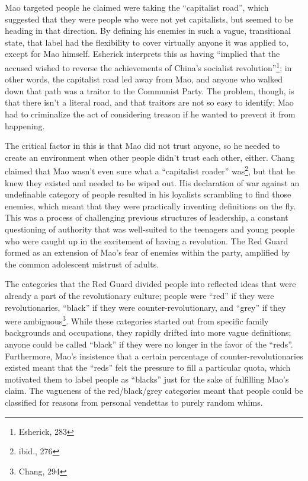 Mao targeted people he claimed were taking the ``capitalist road'', which
suggested that they were people who were not yet capitalists, but seemed to be
heading in that direction. By defining his enemies in such a vague, transitional
state, that label had the flexibility to cover virtually anyone it was applied
to, except for Mao himself. Esherick interprets this as having ``implied that
the accused wished to reverse the achievements of China's socialist
revolution''\footnote{Esherick, 283}; in other words, the capitalist road led
away from Mao, and anyone who walked down that path was a traitor to the
Communist Party. The problem, though, is that there isn't a literal road, and
that traitors are not so easy to identify; Mao had to criminalize the act of
considering treason if he wanted to prevent it from happening.

The critical factor in this is that Mao did not trust anyone, so he needed to
create an environment when other people didn't trust each other, either. Chang
claimed that Mao wasn't even sure what a ``capitalist roader''
was\footnote{ibid., 276}, but that he knew they existed and needed to be wiped
out. His declaration of war against an undefinable category of people resulted
in his loyalists scrambling to find those enemies, which meant that they were
practically inventing definitions on the fly. This was a process of challenging
previous structures of leadership, a constant questioning of authority that was
well-suited to the teenagers and young people who were caught up in the
excitement of having a revolution. The Red Guard formed as an extension of Mao's
fear of enemies within the party, amplified by the common adolescent mistrust of
adults.

The categories that the Red Guard divided people into reflected ideas that were
already a part of the revolutionary culture; people were ``red'' if they were
revolutionaries, ``black'' if they were counter-revolutionary, and ``grey'' if
they were ambiguous\footnote{Chang, 294}. While these categories started out
from specific family backgrounds and occupations, they rapidly drifted into more
vague definitions; anyone could be called ``black'' if they were no longer in
the favor of the ``reds''. Furthermore, Mao's insistence that a certain
percentage of counter-revolutionaries existed meant that the ``reds'' felt the
pressure to fill a particular quota, which motivated them to label people as
``blacks'' just for the sake of fulfilling Mao's claim. The vagueness of the
red/black/grey categories meant that people could be classified for reasons from
personal vendettas to purely random whims.

